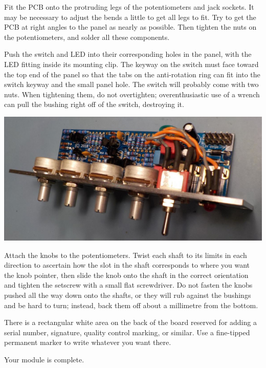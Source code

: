 Fit the PCB onto the protruding legs of the potentiometers and jack sockets. 
It may be necessary to adjust the bends a little to get all legs to fit. 
Try to get the PCB at right angles to the panel as nearly as possible.  Then
tighten the nuts on the potentiometers, and solder all these components.

Push the switch and LED into their corresponding holes in the panel, with
the LED fitting inside its mounting clip.  The keyway on the switch must
face toward the top end of the panel so that the tabs on the anti-rotation
ring can fit into the switch keyway and the small panel hole.  The switch
will probably come with two nuts.  When tightening them, do not overtighten;
overenthusiastic use of a wrench can pull the bushing right off of the
switch, destroying it.

\noindent\includegraphics[width=\linewidth]{panel-parts2.jpg}

Attach the knobs to the potentiometers.  Twist each shaft to its limits in
each direction to ascertain how the slot in the shaft corresponds to where
you want the knob pointer, then slide the knob onto the shaft in the correct
orientation and tighten the setscrew with a small flat screwdriver.  Do not
fasten the knobs pushed all the way down onto the shafts, or they will rub
against the bushings and be hard to turn; instead, back them off about a
millimetre from the bottom.

There is a rectangular white area on the back of the board
reserved for adding a serial number, signature, quality control marking, or
similar.  Use a fine-tipped permanent marker to write whatever you want
there.

Your module is complete.

